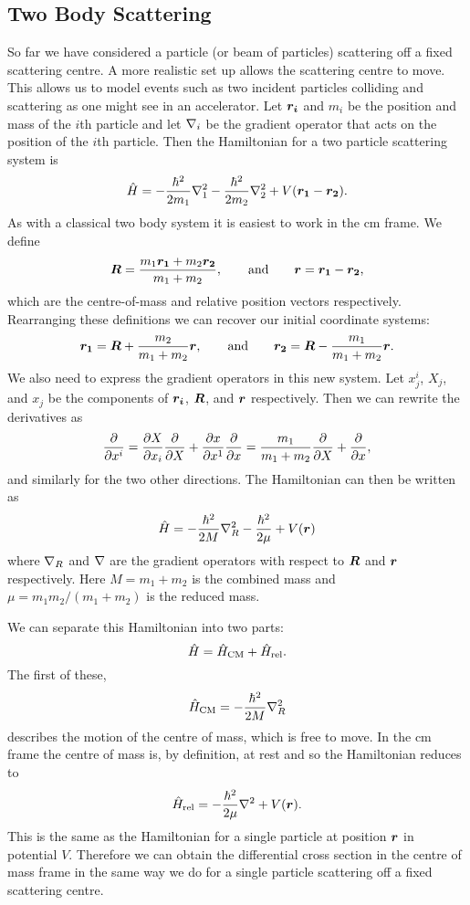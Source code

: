 \documentclass[a4paper]{article}
\begin{document}
    \subsection{Two Body Scattering}
    So far we have considered a particle (or beam of particles) scattering off a fixed scattering centre.
    A more realistic set up allows the scattering centre to move.
    This allows us to model events such as two incident particles colliding and scattering as one might see in an accelerator.
    Let \(\bm{r_i}\) and \(m_i\) be the position and mass of the \(i\)th particle and let \(\nabla_i\) be the gradient operator that acts on the position of the \(i\)th particle.
    Then the Hamiltonian for a two particle scattering system is
    \[\hat{H} = - \frac{\hbar^2}{2m_1} \nabla_1^2 - \frac{\hbar^2}{2m_2} \nabla_2^2 + V(\bm{r_1} - \bm{r_2}).\]
    As with a classical two body system it is easiest to work in the \gls{cm} frame.
    We define
    \[\bm{R} = \frac{m_1\bm{r_1} + m_2\bm{r_2}}{m_1 + m_2}, \qquad\text{and}\qquad \bm{r} = \bm{r_1} - \bm{r_2},\]
    which are the centre-of-mass and relative position vectors respectively.
    Rearranging these definitions we can recover our initial coordinate systems:
    \[\bm{r_1} = \bm{R} + \frac{m_2}{m_1 + m_2}\bm{r}, \qquad \text{and}\qquad \bm{r_2} = \bm{R} - \frac{m_1}{m_1 + m_2} \bm{r}.\]
    We also need to express the gradient operators in this new system.
    Let \(x_j^{i}\), \(X_j\), and \(x_j\) be the components of \(\bm{r_i}\), \(\bm{R}\), and \(\bm{r}\) respectively.
    Then we can rewrite the derivatives as
    \[\pdv{x^i} = \pdv{X}{x_i}\pdv{X} + \pdv{x}{x^1}\pdv{x} = \frac{m_1}{m_1 + m_2}\pdv{X} + \pdv{x},\]
    and similarly for the two other directions.
    The Hamiltonian can then be written as
    \[\hat{H} = -\frac{\hbar^2}{2M}\nabla_{R}^2 - \frac{\hbar^2}{2\mu} + V(\bm{r})\]
    where \(\nabla_R\) and \(\nabla\) are the gradient operators with respect to \(\bm{R}\) and \(\bm{r}\) respectively.
    Here \(M = m_1 + m_2\) is the combined mass and \(\mu = m_1m_2/(m_1 + m_2)\) is the reduced mass.
    
    We can separate this Hamiltonian into two parts:
    \[\hat{H} = \hat{H}_{\mathrm{CM}} + \hat{H}_{\mathrm{rel}}.\]
    The first of these,
    \[\hat{H}_{\mathrm{CM}} = -\frac{\hbar^2}{2M}\nabla_R^2\]
    describes the motion of the centre of mass, which is free to move.
    In the \gls{cm} frame the centre of mass is, by definition, at rest and so the Hamiltonian reduces to
    \[\hat{H}_{\mathrm{rel}} = -\frac{\hbar^2}{2\mu}\nabla^2 + V(\bm{r}).\]
    This is the same as the Hamiltonian for a single particle at position \(\bm{r}\) in potential \(V\).
    Therefore we can obtain the differential cross section in the centre of mass frame in the same way we do for a single particle scattering off a fixed scattering centre.
    
\end{document}
